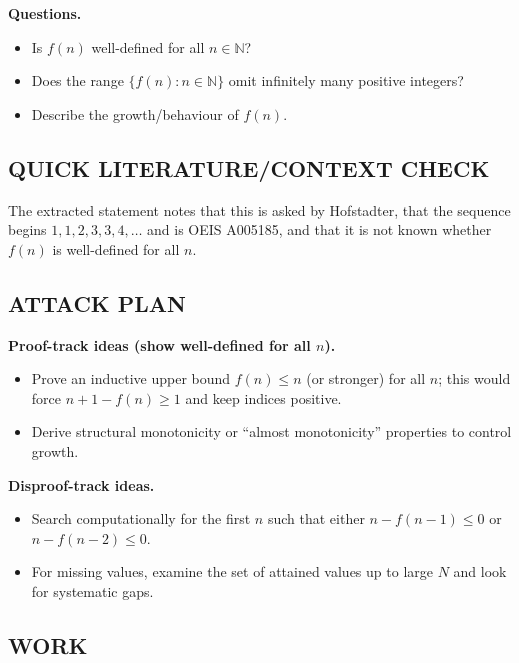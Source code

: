 \textbf{Questions.}
\begin{itemize}
\item[(Q1)] Is $f(n)$ well-defined for all $n\in\mathbb{N}$?
\item[(Q2)] Does the range $\{f(n): n\in\mathbb{N}\}$ omit infinitely many positive integers?
\item[(Q3)] Describe the growth/behaviour of $f(n)$.
\end{itemize}

\subsection*{QUICK LITERATURE/CONTEXT CHECK}
The extracted statement notes that this is asked by Hofstadter, that the sequence begins $1,1,2,3,3,4,\dots$ and is OEIS A005185, and that it is not known whether $f(n)$ is well-defined for all $n$.

\subsection*{ATTACK PLAN}
\textbf{Proof-track ideas (show well-defined for all $n$).}
\begin{itemize}
\item Prove an inductive upper bound $f(n)\le n$ (or stronger) for all $n$; this would force $n+1-f(n)\ge 1$ and keep indices positive.
\item Derive structural monotonicity or ``almost monotonicity'' properties to control growth.
\end{itemize}
\textbf{Disproof-track ideas.}
\begin{itemize}
\item Search computationally for the first $n$ such that either $n-f(n-1)\le 0$ or $n-f(n-2)\le 0$.
\item For missing values, examine the set of attained values up to large $N$ and look for systematic gaps.
\end{itemize}

\subsection*{WORK}
